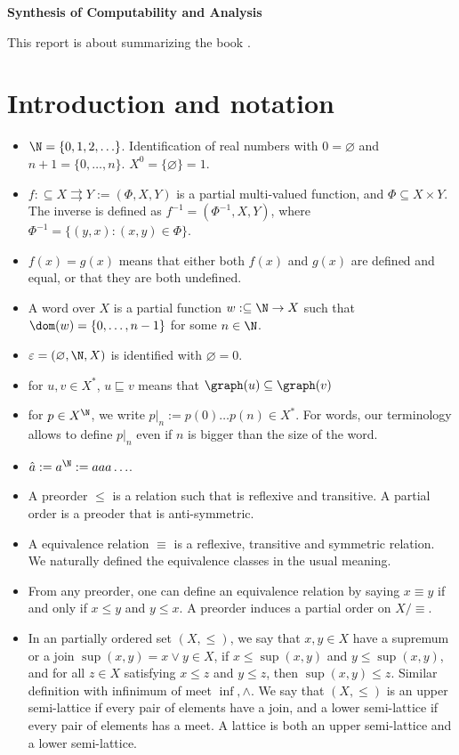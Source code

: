 \documentclass[12pt]{article}
\begin{document}
\begin{center}
    \bf
    Synthesis of Computability and Analysis
\end{center}

This report is about summarizing the book \cite{brattka2018computability}.

\section{Introduction and notation}

\begin{itemize}
    \item $\N = \{0,1,2,\ldots\}$. Identification of real numbers with $0 = \varnothing$ and $n+1 = \{0,\ldots,n\}$. $X^0 = \{\varnothing\} = 1$.
    \item $f : \subseteq X\rightrightarrows Y := (\Phi,X,Y)$ is a partial multi-valued function, and $\Phi \subseteq X \times Y$. The inverse is defined as $f^{-1} = ( \Phi^{-1},X,Y)$, where $\Phi^{-1} = \{ (y,x) : (x,y) \in \Phi\}$.
    \item $f(x) = g(x)$ means that either both $f(x)$ and $g(x)$ are defined and equal, or that they are both undefined.
    \item A word over $X$ is a partial function $w : \subseteq \N \to X$ such that $\dom(w) = \{0, \ldots, n-1\}$ for some $n \in \N$.
    \item $\varepsilon = (\varnothing, \N, X)$ is identified with $\varnothing = 0$.
    \item for $u,v \in X^\ast$, $u \sqsubseteq v$ means that $\graph(u) \subseteq \graph(v)$
    \item for $p \in X^\N$, we write $p|_n := p(0)\ldots p(n) \in X^\ast$. For words, our terminology allows to define $p|_n$ even if $n$ is bigger than the size of the word.
    \item $\hat a := a^\N := aaa\ldots$.
    \item A preorder $\leq$ is a relation such that is reflexive and transitive. A partial order is a preoder that is anti-symmetric.
    \item A equivalence relation $\equiv$ is a reflexive, transitive and symmetric relation. We naturally defined the equivalence classes in the usual meaning.
    \item From any preorder, one can define an equivalence relation by saying $x \equiv y$ if and only if $x \leq y$ and $y \leq x$. A preorder induces a partial order on $X / \equiv$. 
    \item In an partially ordered set $(X,\leq)$, we say that $x,y \in X$ have a supremum or a join $\sup(x,y) = x \vee y \in X$, if $x \leq \sup(x,y)$ and $y \leq \sup(x,y)$, and for all $z \in X$ satisfying $x \leq z$ and $y \leq z$, then $\sup(x,y) \leq z$. Similar definition with infinimum of meet $\inf, \wedge$. We say that $(X,\leq)$ is an upper semi-lattice if every pair of elements have a join, and a lower semi-lattice if every pair of elements has a meet. A lattice is both an upper semi-lattice and a lower semi-lattice.

\end{itemize}
\end{document}
